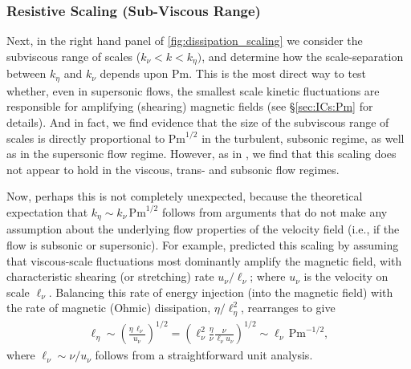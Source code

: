 \documentclass[12pt,twoside]{extreport}
\newcommand{\rbrac}[1]{\left( #1 \right)} %
\newcommand{\mPrm}{\ensuremath{\mathrm{Pm}}} %
\newcommand{\ie}{i.e.,\xspace} %
\begin{document}
\subsubsection{Resistive Scaling (Sub-Viscous Range)}
\label{sec:results:dissipation:keta}

Next, in the right hand panel of \autoref{fig:dissipation_scaling} we consider the subviscous range of scales ($k_\nu < k < k_\eta)$, and determine how the scale-separation between $k_\eta$ and $k_\nu$ depends upon $\mPrm$. This is the most direct way to test whether, even in supersonic flows, the smallest scale kinetic fluctuations are responsible for amplifying (shearing) magnetic fields (see \S\ref{sec:ICs:Pm} for details). And in fact, we find evidence that the size of the subviscous range of scales is directly proportional to $\mPrm^{1/2}$ in the turbulent, subsonic regime, as well as in the supersonic flow regime. However, as in , we find that this scaling does not appear to hold in the viscous, trans- and subsonic flow regimes.

Now, perhaps this is not completely unexpected, because the theoretical expectation that $k_\eta \sim k_\nu \,\mPrm^{1/2}$ follows from arguments that do not make any assumption about the underlying flow properties of the velocity field (\ie if the flow is subsonic or supersonic). For example, \citet{schekochihin2002spectra} predicted this scaling by assuming that viscous-scale fluctuations most dominantly amplify the magnetic field, with characteristic shearing (or stretching) rate $u_\nu / \ell_\nu$; where $u_\nu$ is the velocity on scale $\ell_\nu$. Balancing this rate of energy injection (into the magnetic field) with the rate of magnetic (Ohmic) dissipation, $\eta / \ell_\eta^2$, rearranges to give
\begin{align}
    \ell_\eta
        \sim \rbrac{\frac{\eta \, \ell_\nu}{u_\nu}}^{1/2}
        = \rbrac{\ell_\nu^2 \frac{\eta}{\nu} \frac{\nu}{\ell_\nu u_\nu}}^{1/2}
        \sim \ell_\nu \, \mPrm^{-1/2}
    , \label{eqn:keta:result}
\end{align}
where $\ell_\nu \sim \nu / u_\nu$ follows from a straightforward unit analysis.
\end{document}

